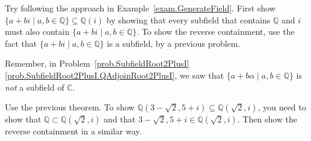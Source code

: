 \begin{hint*}
Try following the approach in Example~\ref{exam.GenerateField}. First show  $\{a+bi\mid a,b\in \mathbb{Q}\} \subseteq \mathbb{Q}(i)$ by showing that every subfield that contains $\mathbb{Q}$ and $i$ must also contain $\{a+bi\mid a,b\in \mathbb{Q}\}$. To show the reverse containment, use the fact that $\{a+bi\mid a,b\in \mathbb{Q}\}$ is a subfield, by a previous problem.
\end{hint*}

\begin{hint*}
Remember, in Problem~\ref{prob.SubfieldRoot2PlusI}\ref{prob.SubfieldRoot2PlusI.QAdjoinRoot2PlusI}, we saw that $\{a+b\alpha\mid a,b\in \mathbb{Q}\}$ is \emph{not} a subfield of $\mathbb{C}$.
\end{hint*}

\begin{hint*}
Use the previous theorem. To show  $\mathbb{Q}\left(3-\sqrt{2},5+i\right) \subseteq \mathbb{Q}\left(\sqrt{2},i\right)$, you need to show that $\mathbb{Q}\subset \mathbb{Q}\left(\sqrt{2},i\right)$ and that $3-\sqrt{2},5+i\in \mathbb{Q}\left(\sqrt{2},i\right)$. Then show the reverse containment in a similar way.
\end{hint*}








